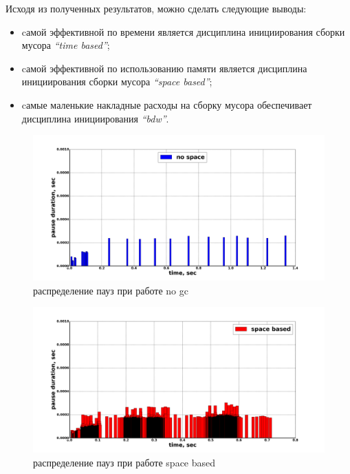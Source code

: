 Исходя из полученных результатов, можно сделать следующие выводы:
\begin{itemize}
\item cамой эффективной по времени является дисциплина инициирования сборки мусора
\emph{``time based''};
\item cамой эффективной по использованию памяти является дисциплина инициирования
сборки мусора \emph{``space based''};
\item cамые маленькие накладные расходы на сборку мусора обеспечивает
дисциплина инициирования \emph{``bdw''}.
\end{itemize}

\begin{figure}[ph]
\caption{\label{pic:pause-no-gc}распределение пауз при работе no gc}
\includegraphics[width=1\linewidth]{Bakradze/no-apce.png}
\end{figure}

\begin{figure}[ph]
\caption{\label{pic:space-based-pause}распределение пауз при работе space based}
\includegraphics[width=1\linewidth]{Bakradze/space-based-pause-same.png}
\end{figure}

